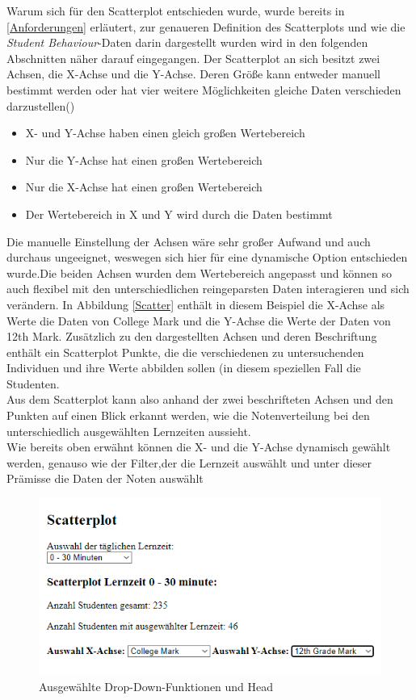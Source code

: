\documentclass[usegeometry=true]{scrartcl}
\begin{document}
Warum sich für den Scatterplot entschieden wurde, wurde bereits in \ref{Anforderungen} erläutert, zur genaueren Definition des Scatterplots und wie die \textit{Student Behaviour}-Daten darin dargestellt wurden wird in den folgenden Abschnitten näher darauf eingegangen.
\pagebreak
Der Scatterplot an sich besitzt zwei Achsen, die X-Achse und die Y-Achse. Deren Größe kann entweder manuell bestimmt werden oder hat vier weitere Möglichkeiten gleiche Daten verschieden darzustellen(\cite{Hinneburg2022})\\
\begin{itemize}
\item  X- und Y-Achse haben einen gleich großen Wertebereich
\item Nur die Y-Achse hat einen großen Wertebereich
\item Nur die X-Achse hat einen großen Wertebereich
\item Der Wertebereich in X und Y wird durch die Daten bestimmt
\end{itemize}

Die manuelle Einstellung der Achsen wäre sehr großer Aufwand und auch durchaus ungeeignet, weswegen sich hier für eine dynamische Option entschieden wurde.Die beiden Achsen wurden dem Wertebereich angepasst und können so auch flexibel mit den unterschiedlichen reingeparsten Daten interagieren und sich verändern. In Abbildung \ref{Scatter} enthält in diesem Beispiel die X-Achse als Werte die Daten von College Mark und die Y-Achse die Werte der Daten von 12th Mark.
Zusätzlich zu den dargestellten Achsen und deren Beschriftung enthält ein Scatterplot Punkte, die die verschiedenen zu untersuchenden Individuen und ihre Werte abbilden sollen (in diesem speziellen Fall die Studenten.\\
Aus dem Scatterplot kann also anhand der zwei beschrifteten Achsen und den Punkten auf einen Blick erkannt werden, wie die Notenverteilung bei den unterschiedlich ausgewählten Lernzeiten aussieht.\\

\noindent Wie bereits oben erwähnt können die X- und die Y-Achse dynamisch gewählt werden, genauso wie der \glqq Filter\grqq ,der die Lernzeit auswählt und unter dieser Prämisse die Daten der Noten auswählt

\begin{figure}[h]
\begin{center}
	\includegraphics[scale=0.75]{ScatterDrop.png}
	\caption{Ausgewählte Drop-Down-Funktionen und Head}
	\label{ScatterDrop}
\end{center}
\end{figure}
\end{document}
